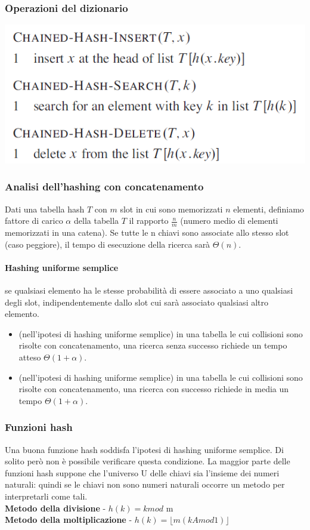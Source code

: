 \documentclass[11pt,a4paper]{article}
\begin{document}
\subsubsection{Operazioni del dizionario}
\begin{center}
      \includegraphics[scale=0.35]{img/dizionario2.png}
\end{center}
\subsubsection{Analisi dell’hashing con concatenamento}
Dati una tabella hash $T$ con $m$ slot in cui sono memorizzati $n$ elementi, definiamo fattore di carico $\alpha$ della
tabella $T$ il rapporto $\frac{n}{m}$ (numero medio di elementi memorizzati in una catena).
Se tutte le n chiavi sono associate allo stesso slot (caso peggiore), il tempo di esecuzione della ricerca sarà
$\Theta(n)$.

\paragraph{Hashing uniforme semplice} se qualsiasi elemento ha le stesse probabilità di essere associato a uno qualsiasi
degli slot, indipendentemente dallo slot cui sarà associato qualsiasi altro elemento.
\begin{itemize}
  \item (nell’ipotesi di hashing uniforme semplice) in una tabella le cui collisioni sono risolte con concatenamento,
  una ricerca senza successo richiede un tempo atteso $\Theta(1+\alpha)$.
  \item  (nell’ipotesi di hashing uniforme semplice) in una tabella le cui collisioni sono risolte con concatenamento,
  una ricerca con successo richiede in media un tempo $\Theta(1+\alpha)$.
\end{itemize}

\subsubsection{Funzioni hash}
Una buona funzione hash soddisfa l’ipotesi di hashing uniforme semplice. Di solito però non è possibile
verificare questa condizione.
La maggior parte delle funzioni hash suppone che l’universo U delle chiavi sia l’insieme dei numeri naturali:
quindi se le chiavi non sono numeri naturali occorre un metodo per interpretarli come tali.\\
\textbf{Metodo della divisione} - $h(k) = k mod$ m\\
\textbf{Metodo della moltiplicazione} - $h(k) = \lfloor m (k A mod 1)\rfloor$
\end{document}
